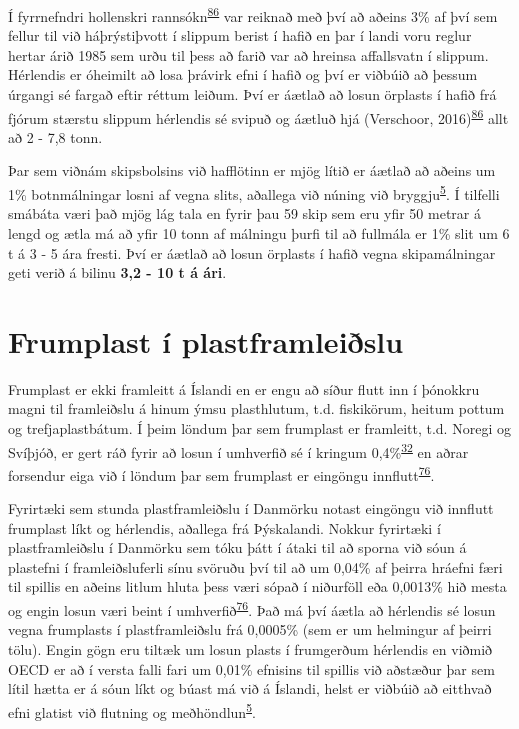 \documentclass[icelandic,]{book}
\begin{document}
Í fyrrnefndri hollenskri rannsókn\textsuperscript{\protect\hyperlink{ref-Verschoor2016}{86}} var reiknað með því að aðeins 3\% af því sem fellur til við háþrýstiþvott í slippum berist í hafið en þar í landi voru reglur hertar árið 1985 sem urðu til þess að farið var að hreinsa affallsvatn í slippum. Hérlendis er óheimilt að losa þrávirk efni í hafið og því er viðbúið að þessum úrgangi sé fargað eftir réttum leiðum. Því er áætlað að losun örplasts í hafið frá fjórum stærstu slippum hérlendis sé svipuð og áætluð hjá (Verschoor, 2016)\textsuperscript{\protect\hyperlink{ref-Verschoor2016}{86}} allt að 2 - 7,8 tonn.

Þar sem viðnám skipsbolsins við hafflötinn er mjög lítið er áætlað að aðeins um 1\% botnmálningar losni af vegna slits, aðallega við núning við bryggju\textsuperscript{\protect\hyperlink{ref-OECD2009}{5}}. Í tilfelli smábáta væri það mjög lág tala en fyrir þau 59 skip sem eru yfir 50 metrar á lengd og ætla má að yfir 10 tonn af málningu þurfi til að fullmála er 1\% slit um 6 t á 3 - 5 ára fresti. Því er áætlað að losun örplasts í hafið vegna skipamálningar geti verið á bilinu \textbf{3,2 - 10 t á ári}.

\hypertarget{frumplast-i-plastframleislu}{%
\section*{Frumplast í plastframleiðslu}\label{frumplast-i-plastframleislu}}

Frumplast er ekki framleitt á Íslandi en er engu að síður flutt inn í þónokkru magni til framleiðslu á hinum ýmsu plasthlutum, t.d. fiskikörum, heitum pottum og trefjaplastbátum. Í þeim löndum þar sem frumplast er framleitt, t.d. Noregi og Svíþjóð, er gert ráð fyrir að losun í umhverfið sé í kringum 0,4\%\textsuperscript{\protect\hyperlink{ref-sundt2014sources}{32}} en aðrar forsendur eiga við í löndum þar sem frumplast er eingöngu innflutt\textsuperscript{\protect\hyperlink{ref-lassen2015microplastics}{76}}.

Fyrirtæki sem stunda plastframleiðslu í Danmörku notast eingöngu við innflutt frumplast líkt og hérlendis, aðallega frá Þýskalandi. Nokkur fyrirtæki í plastframleiðslu í Danmörku sem tóku þátt í átaki til að sporna við sóun á plastefni í framleiðsluferli sínu svöruðu því til að um 0,04\% af þeirra hráefni færi til spillis en aðeins litlum hluta þess væri sópað í niðurföll eða 0,0013\% hið mesta og engin losun væri beint í umhverfið\textsuperscript{\protect\hyperlink{ref-lassen2015microplastics}{76}}. Það má því áætla að hérlendis sé losun vegna frumplasts í plastframleiðslu frá 0,0005\% (sem er um helmingur af þeirri tölu). Engin gögn eru tiltæk um losun plasts í frumgerðum hérlendis en viðmið OECD er að í versta falli fari um 0,01\% efnisins til spillis við aðstæður þar sem lítil hætta er á sóun líkt og búast má við á Íslandi, helst er viðbúið að eitthvað efni glatist við flutning og meðhöndlun\textsuperscript{\protect\hyperlink{ref-OECD2009}{5}}.
\end{document}
